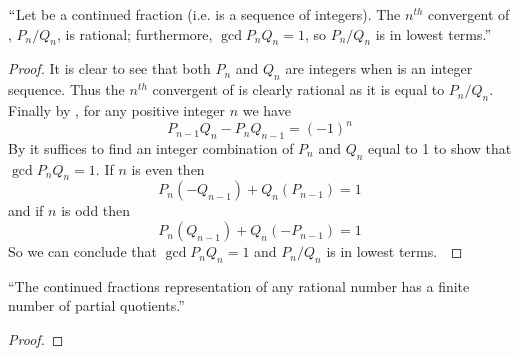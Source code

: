         \begin{corollary}
            $``$Let  be a continued fraction (i.e.
             is a sequence of integers). The $n^{th}$
            convergent of , $P_n / Q_n$, is rational;
            furthermore, $\gcd{P_n}{Q_n} = 1$, so $P_n / Q_n$ is in lowest
            terms.''
        \end{corollary}
        \begin{proof}
            It is clear to see that both $P_n$ and $Q_n$ are integers when
             is an integer sequence. Thus the $n^{th}$
            convergent of  is clearly rational as it is equal
            to $P_n / Q_n$. Finally by ,
            for any positive integer $n$ we have
            \begin{equation}
                \label{Cont. Frac. GCD Eq 1}
                P_{n - 1} Q_n - P_n Q_{n - 1} = (-1)^n
            \end{equation}
            By  it suffices to find
            an integer combination of $P_n$ and $Q_n$ equal to 1 to show that
            $\gcd{P_n}{Q_n} = 1$. If $n$ is even then
            \begin{equation}
                P_n (-Q_{n - 1}) + Q_n (P_{n - 1}) = 1
            \end{equation}
            and if $n$ is odd then
            \begin{equation}
                P_{n} (Q_{n - 1}) + Q_n(-P_{n - 1}) = 1
            \end{equation}
            So we can conclude that $\gcd{P_n}{Q_n} = 1$ and $P_n / Q_n$ is in
            lowest terms.~\QED
        \end{proof}
        \begin{theorem}
            ``The continued fractions representation of any rational number has a finite number
              of partial quotients.''
        \end{theorem}
        \begin{proof}
        \end{proof}
